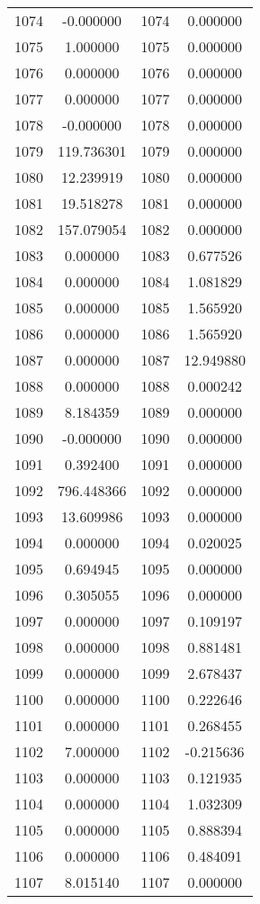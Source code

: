 \documentclass[12pt]{article}
\begin{document}
\begin{longtable}{@{}cccc@{}}
1074 & -0.000000 & 1074 & 0.000000 \\
1075 & 1.000000 & 1075 & 0.000000 \\
1076 & 0.000000 & 1076 & 0.000000 \\
1077 & 0.000000 & 1077 & 0.000000 \\
1078 & -0.000000 & 1078 & 0.000000 \\
1079 & 119.736301 & 1079 & 0.000000 \\
1080 & 12.239919 & 1080 & 0.000000 \\
1081 & 19.518278 & 1081 & 0.000000 \\
1082 & 157.079054 & 1082 & 0.000000 \\
1083 & 0.000000 & 1083 & 0.677526 \\
1084 & 0.000000 & 1084 & 1.081829 \\
1085 & 0.000000 & 1085 & 1.565920 \\
1086 & 0.000000 & 1086 & 1.565920 \\
1087 & 0.000000 & 1087 & 12.949880 \\
1088 & 0.000000 & 1088 & 0.000242 \\
1089 & 8.184359 & 1089 & 0.000000 \\
1090 & -0.000000 & 1090 & 0.000000 \\
1091 & 0.392400 & 1091 & 0.000000 \\
1092 & 796.448366 & 1092 & 0.000000 \\
1093 & 13.609986 & 1093 & 0.000000 \\
1094 & 0.000000 & 1094 & 0.020025 \\
1095 & 0.694945 & 1095 & 0.000000 \\
1096 & 0.305055 & 1096 & 0.000000 \\
1097 & 0.000000 & 1097 & 0.109197 \\
1098 & 0.000000 & 1098 & 0.881481 \\
1099 & 0.000000 & 1099 & 2.678437 \\
1100 & 0.000000 & 1100 & 0.222646 \\
1101 & 0.000000 & 1101 & 0.268455 \\
1102 & 7.000000 & 1102 & -0.215636 \\
1103 & 0.000000 & 1103 & 0.121935 \\
1104 & 0.000000 & 1104 & 1.032309 \\
1105 & 0.000000 & 1105 & 0.888394 \\
1106 & 0.000000 & 1106 & 0.484091 \\
1107 & 8.015140 & 1107 & 0.000000 \\

\end{longtable}
\end{document}
